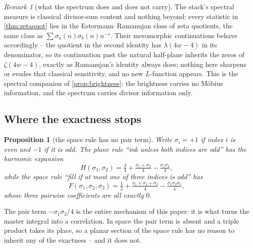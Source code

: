 \documentclass[11pt]{amsart}
\newtheorem{proposition}[theorem]{Proposition}
\theoremstyle{definition}
\theoremstyle{remark}
\newtheorem{remark}[theorem]{Remark}
\begin{document}
\begin{remark}[what the spectrum does and does not carry]
\label{rem:spectrumcap}
The stack's spectral measure is classical divisor-sum content and nothing beyond: every statistic in \cref{thm:zetaquot} lies in the Estermann--Ramanujan class of zeta quotients, the same class as $\sum \sigma_a(n)\sigma_b(n)n^{-s}$. Their meromorphic continuations behave accordingly -- the quotient in the second identity has $\lambda(4w-4)$ in its denominator, so its continuation past the natural half-plane inherits the zeros of $\zeta(4w-4)$, exactly as Ramanujan's identity always does; nothing here sharpens or evades that classical sensitivity, and no new $L$-function appears. This is the spectral companion of \cref{prop:brightness}: the brightness carries no M\"obius information, and the spectrum carries divisor information only.
\end{remark}

\subsection{Where the exactness stops}
\label{sec:stops}

\begin{proposition}[the space rule has no pair term]
\label{prop:space}
Write $\sigma_i=+1$ if index $i$ is even and $-1$ if it is odd. The plane rule ``ink unless both indices are odd'' has the harmonic expansion
\[
H(\sigma_1,\sigma_2)=\tfrac34+\tfrac{\sigma_1+\sigma_2}{4}-\tfrac{\sigma_1\sigma_2}{4},
\]
while the space rule ``fill if at most one of three indices is odd'' has
\[
F(\sigma_1,\sigma_2,\sigma_3)=\tfrac12+\tfrac{\sigma_1+\sigma_2+\sigma_3}{4}-\tfrac{\sigma_1\sigma_2\sigma_3}{4},
\]
whose three pairwise coefficients are all exactly $0$.
\end{proposition}

The pair term $-\sigma_1\sigma_2/4$ is the entire mechanism of this paper: it is what turns the master integral into a correlation. In space the pair term is absent and a triple product takes its place, so a planar section of the space rule has no reason to inherit any of the exactness -- and it does not.
\end{document}
